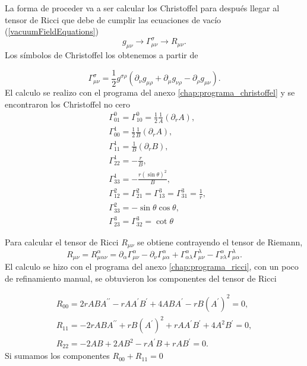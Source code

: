 La forma de proceder va a ser  calcular los Christoffel para después llegar al tensor de Ricci que debe de cumplir las ecuaciones de vacío (\ref{vacuumFieldEquations})
\begin{equation*}
    g_{\mu \nu} \rightarrow \Gamma_{\mu \nu}^\sigma \rightarrow R_{\mu \nu}.
\end{equation*}
Los símbolos de Christoffel los obtenemos a partir de 

\begin{equation}
    \Gamma_{\mu \nu}^\sigma=\frac{1}{2} g^{\sigma \rho}\left(\partial_\nu g_{\mu \rho}+\partial_\mu g_{\nu \rho}-\partial_\rho g_{\mu \nu}\right).
\end{equation}
El calculo se realizo con el programa del anexo \ref{chap:programa_christoffel} y se encontraron los Christoffel no cero 
\begin{equation}
\begin{aligned}
    &\Gamma_{01}^0=\Gamma_{10}^0=\frac{1}{2} \frac{1}{A}\left(\partial_r A\right),\\ 
    &\Gamma_{00}^1=\frac{1}{2} \frac{1}{B}\left(\partial_r A\right),\\
    &\Gamma_{11}^1=\frac{1}{B}\left(\partial_r B\right),\\
    &\Gamma_{22}^1=-\frac{r}{B},\\
    &\Gamma_{33}^1=-\frac{r(\sin \theta)^2}{B},\\
    &\Gamma_{12}^2=\Gamma_{21}^2=\Gamma_{13}^3=\Gamma_{31}^3=\frac{1}{r},\\
    &\Gamma_{33}^2=-\sin \theta \cos \theta,\\
    &\Gamma_{23}^3=\Gamma_{32}^3=\cot \theta
\end{aligned}
\end{equation}

Para calcular el tensor de Ricci $R_{\mu \nu}$ se obtiene contrayendo el tensor de Riemann,
\begin{equation}
    R_{\mu \nu}=R_{\mu \alpha \nu}^\alpha=\partial_\alpha \Gamma_{\mu \nu}^\alpha-\partial_\nu \Gamma_{\mu \alpha}^\alpha+\Gamma_{\alpha \lambda}^\alpha \Gamma_{\mu \nu}^\lambda-\Gamma_{\nu \lambda}^\alpha \Gamma_{\mu \alpha}^\lambda .
    \label{eq:ricci_tensor}
\end{equation}
El calculo se hizo con el programa del anexo \ref{chap:programa_ricci}, con un poco de refinamiento manual, se obtuvieron los componentes del tensor de Ricci 

\begin{equation}
    \begin{array}{l}
    R_{00}=2 r A B A^{\prime \prime}-r A A^{\prime} B^{\prime}+4 A B A^{\prime}-r B\left(A^{\prime}\right)^2=0 ,\\
    R_{11}=-2 r A B A^{\prime \prime}+r B\left(A^{\prime}\right)^2+r A A^{\prime} B^{\prime}+4 A^2 B^{\prime}=0, \\
    R_{22}=-2 A B+2 A B^2-r A^{\prime} B+r A B^{\prime}=0.
    \end{array}
    \end{equation}
Si sumamos los componentes $R_{00} + R_{11} = 0 $


